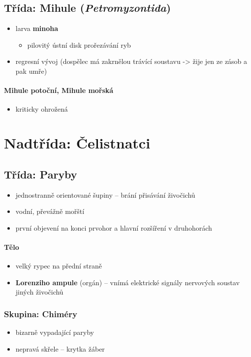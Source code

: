 \subsection{Třída: Mihule (\textit{Petromyzontida})}
\begin{itemize}
\item larva \textbf{minoha}
	\begin{itemize}
	\item pilovitý ústní disk \ra prořezávání ryb
	\end{itemize}
\item regresní vývoj (dospělec má zakrnělou trávící soustavu -> žije jen ze zásob a pak umře)
\end{itemize}

\paragraph{Mihule potoční, Mihule mořská}
\begin{itemize}
\item kriticky ohrožená
\end{itemize}

\newpage
\section{Nadtřída: Čelistnatci}
\subsection{Třída: Paryby}
\begin{itemize}
\item jednostranně orientované šupiny -- brání přisávání živočichů
\item vodní, převážně mořští
\item první objevení na konci prvohor a hlavní rozšíření v druhohorách
\end{itemize}

\paragraph{Tělo}
\begin{itemize}
\item velký rypec na přední straně
\item \textbf{Lorenziho ampule} (orgán) -- vnímá elektrické signály nervových soustav jiných živočichů
\end{itemize}

\subsubsection{Skupina: Chiméry}
\begin{itemize}
\item bizarně vypadající paryby
\item nepravá skřele -- krytka žáber
\end{itemize}

